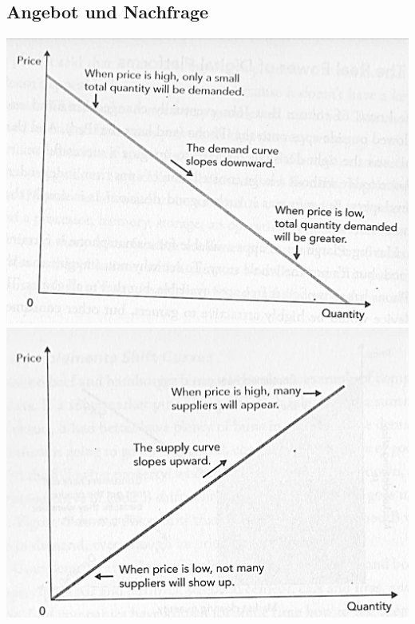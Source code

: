 \subsection{Angebot und Nachfrage}
\begin{multicols}{2}
	\includegraphics[width=1\linewidth]{images/angebot_nachfrage_1}
	\includegraphics[width=1\linewidth]{images/angebot_nachfrage_2}
\end{multicols}


